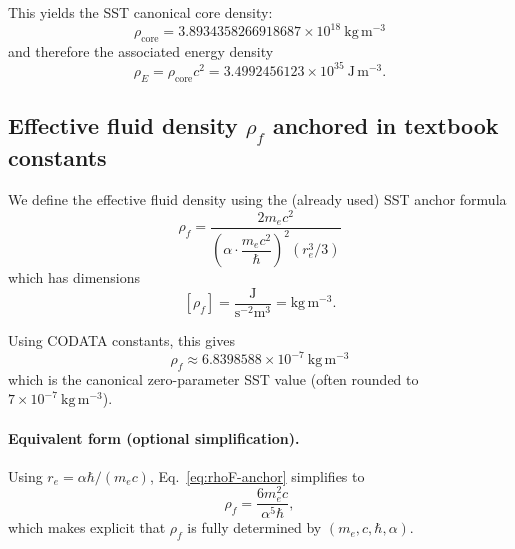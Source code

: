 \documentclass[11pt]{article}
\newcommand{\rhoF}{\rho_{\!f}}\newcommand{\rhof}{\rho_{\!f}}     %
\newcommand{\rhoE}{\rho_{\!E}}\newcommand{\rhoe}{\rho_{\!E}}                           %
\begin{document}
    This yields the SST canonical core density:
    \[
        \boxed{
            \rho_{\text{core}}=3.8934358266918687\times 10^{18}\ \mathrm{kg\,m^{-3}}
        }
    \]
    and therefore the associated energy density
    \begin{equation}
        \boxed{
            \rhoE = \rho_{\text{core}}c^2
            = 3.4992456123\times 10^{35}\ \mathrm{J\,m^{-3}}.
        }
        \label{eq:rhoE-core}
    \end{equation}

    \subsection{Effective fluid density \texorpdfstring{\(\rhoF\)}{rho_f} anchored in textbook constants}
    We define the effective fluid density using the (already used) SST anchor formula
    \begin{equation}
        \boxed{
            \rhoF
            =
            \frac{2 m_e c^2}{
                \left(\alpha\cdot \dfrac{m_e c^2}{\hbar}\right)^2
                \left(r_e^3/3\right)}
        }
        \label{eq:rhoF-anchor}
    \end{equation}
    which has dimensions
    \[
        [\rhoF]=\frac{\mathrm{J}}{\mathrm{s^{-2}m^3}}
        =\mathrm{kg\,m^{-3}}.
    \]

    Using CODATA constants, this gives
    \[
        \boxed{
            \rhoF \approx 6.8398588\times 10^{-7}\ \mathrm{kg\,m^{-3}}
        }
    \]
    which is the canonical zero-parameter SST value (often rounded to \(7\times 10^{-7}\ \mathrm{kg\,m^{-3}}\)).

    \paragraph{Equivalent form (optional simplification).}
        Using \(r_e=\alpha\hbar/(m_e c)\), Eq.~\eqref{eq:rhoF-anchor} simplifies to
        \begin{equation}
            \rhoF = \frac{6m_e^2 c}{\alpha^5 \hbar},
            \label{eq:rhoF-simplified}
        \end{equation}
        which makes explicit that \(\rhoF\) is fully determined by \((m_e,c,\hbar,\alpha)\).
\end{document}
